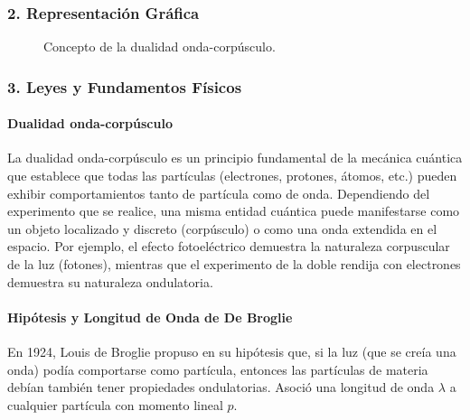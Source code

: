 \subsubsection*{2. Representación Gráfica}
\begin{figure}[H]
    \centering
    \caption{Concepto de la dualidad onda-corpúsculo.}
\end{figure}

\subsubsection*{3. Leyes y Fundamentos Físicos}
\paragraph*{Dualidad onda-corpúsculo}
La dualidad onda-corpúsculo es un principio fundamental de la mecánica cuántica que establece que todas las partículas (electrones, protones, átomos, etc.) pueden exhibir comportamientos tanto de partícula como de onda. Dependiendo del experimento que se realice, una misma entidad cuántica puede manifestarse como un objeto localizado y discreto (corpúsculo) o como una onda extendida en el espacio. Por ejemplo, el efecto fotoeléctrico demuestra la naturaleza corpuscular de la luz (fotones), mientras que el experimento de la doble rendija con electrones demuestra su naturaleza ondulatoria.

\paragraph*{Hipótesis y Longitud de Onda de De Broglie}
En 1924, Louis de Broglie propuso en su hipótesis que, si la luz (que se creía una onda) podía comportarse como partícula, entonces las partículas de materia debían también tener propiedades ondulatorias. Asoció una longitud de onda $\lambda$ a cualquier partícula con momento lineal $p$.

